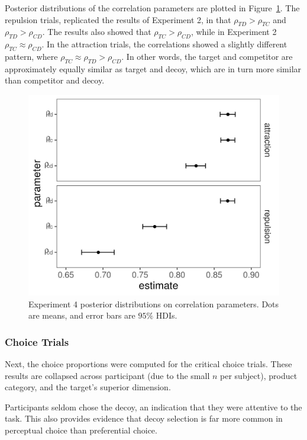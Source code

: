 Posterior distributions of the correlation parameters are plotted in Figure~\ref{fig:price_omega}. The repulsion trials, replicated the results of Experiment 2, in that $\rho_{TD}>\rho_{TC}$ and $\rho_{TD}>\rho_{CD}$. The results also showed that $\rho_{TC}>\rho_{CD}$, while in Experiment 2 $\rho_{TC}\approx\rho_{CD}$. In the attraction trials, the correlations showed a slightly different pattern, where $\rho_{TC}\approx\rho_{TD}>\rho_{CD}$. In other words, the target and competitor are approximately equally similar as target and decoy, which are in turn more similar than competitor and decoy. 

\begin{figure}
    \includegraphics[scale=.5,width=120mm]{figures/price_omega_posteriors.jpeg}
    \caption{Experiment 4 posterior distributions on correlation parameters. Dots are means, and error bars are $95\%$ HDIs.}
    \label{fig:price_omega}
\end{figure}

\subsubsection{Choice Trials}

Next, the choice proportions were computed for the critical choice trials. These results are collapsed across participant (due to the small $n$ per subject), product category, and the target's superior dimension.

Participants seldom chose the decoy, an indication that they were attentive to the task. This also provides evidence that decoy selection is far more common in perceptual choice than preferential choice.

